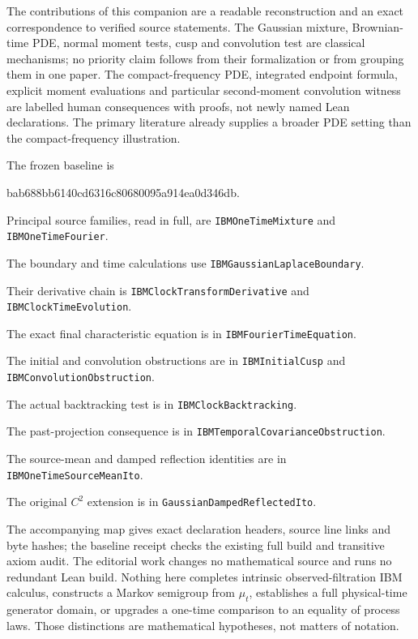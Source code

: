 \documentclass[11pt]{article}
\newcommand{\code}[1]{{\small\nolinkurl{#1}}}
\begin{document}
The contributions of this companion are a readable reconstruction
and an exact correspondence to verified source statements. The
Gaussian mixture, Brownian-time PDE, normal moment tests, cusp and
convolution test are classical mechanisms; no priority claim follows
from their formalization or from grouping them in one paper.
The compact-frequency PDE, integrated endpoint formula, explicit
moment evaluations and particular second-moment convolution witness
are labelled human consequences with proofs, not newly named Lean
declarations. The primary literature already supplies a broader
PDE setting than the compact-frequency illustration.

The frozen baseline is
\begin{center}\small\ttfamily
bab688bb6140cd6316c80680095a914ea0d346db.
\end{center}
Principal source families, read in full, are
\code{IBMOneTimeMixture} and \code{IBMOneTimeFourier}.
\par\noindent
The boundary and time calculations use
\code{IBMGaussianLaplaceBoundary}.
\par\noindent
Their derivative chain is \code{IBMClockTransformDerivative} and
\code{IBMClockTimeEvolution}.
\par\noindent
The exact final characteristic equation is in
\code{IBMFourierTimeEquation}.
\par\noindent
The initial and convolution obstructions are in
\code{IBMInitialCusp} and \code{IBMConvolutionObstruction}.
\par\noindent
The actual backtracking test is in \code{IBMClockBacktracking}.
\par\noindent
The past-projection consequence is in
\code{IBMTemporalCovarianceObstruction}.
\par\noindent
The source-mean and damped reflection identities are in
\code{IBMOneTimeSourceMeanIto}.
\par\noindent
The original $C^2$ extension is in \code{GaussianDampedReflectedIto}.

The accompanying map gives exact declaration headers, source line
links and byte hashes; the baseline receipt checks the existing full
build and transitive axiom audit. The editorial work changes no
mathematical source and runs no redundant Lean build.
Nothing here completes intrinsic observed-filtration IBM calculus,
constructs a Markov semigroup from $\mu_t$, establishes a full
physical-time generator domain, or upgrades a one-time comparison
to an equality of process laws. Those distinctions are mathematical
hypotheses, not matters of notation.
\end{document}
